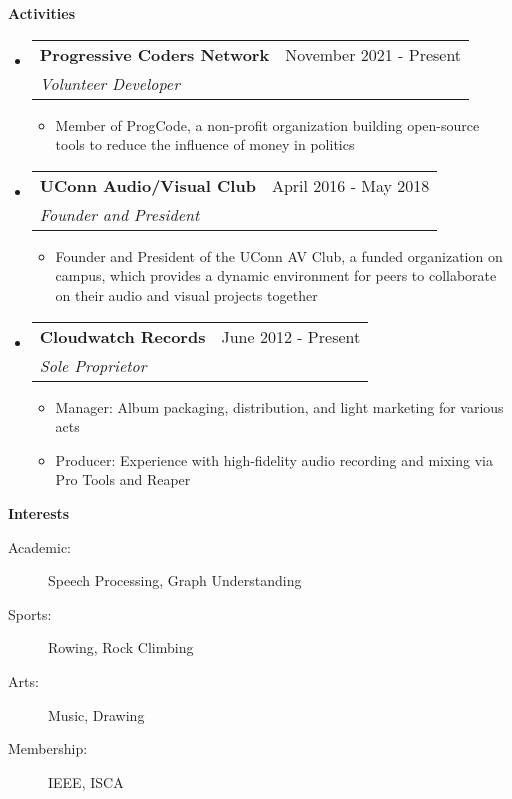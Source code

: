 \documentclass[letterpaper,11pt]{article}
\makeatletter
\newcommand{\resitem}[1]{\item #1 \vspace{-2pt}}
\newcommand{\resheading}[1]{{\large \colorbox{mygrey}{\begin{minipage}{\textwidth}{\textbf{#1 \vphantom{p\^{E}}}}\end{minipage}}}}
\newcommand{\ressubheading}[4]{
\begin{tabular*}{6.5in}{l@{\extracolsep{\fill}}r}
		\textbf{#1} & #2 \\
		\textit{#3} & \textit{#4} \\
\end{tabular*}\vspace{-6pt}}
\makeatother
\begin{document}
\resheading{Activities}
\begin{itemize}
\item
    \ressubheading{Progressive Coders Network}{November 2021 - Present}{Volunteer Developer}{}
    \begin{itemize}
        \resitem{Member of ProgCode, a non-profit organization building open-source tools to reduce the influence of money in politics}
    \end{itemize}
\item 
    \ressubheading{UConn Audio/Visual Club}{April 2016 - May 2018}{Founder and President}{}
    \begin{itemize}
        \resitem{Founder and President of the UConn AV Club, a funded organization on campus, which provides a dynamic environment for peers to collaborate on their audio and visual projects together}
    \end{itemize}
\item 
    \ressubheading{Cloudwatch Records}{June 2012 - Present}{Sole Proprietor}{}
    \begin{itemize}
        \resitem{Manager: Album packaging, distribution, and light marketing for various acts}
        \resitem{Producer: Experience with high-fidelity audio recording and mixing via Pro Tools and Reaper}
    \end{itemize}
\end{itemize}


\resheading{Interests}

\begin{description}
\item[Academic:] Speech Processing, Graph Understanding
\item[Sports:] Rowing, Rock Climbing
\item[Arts:] Music, Drawing
\item[Membership:] IEEE, ISCA
\end{description}
\end{document}
